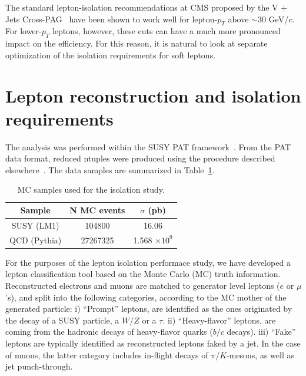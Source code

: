 \documentclass{cmspaper}
\begin{document}
The standard lepton-isolation recommendations at CMS proposed by the V + Jets Cross-PAG~\cite{vjets}
have been shown to work well for lepton-$p_T$ above $\sim 30$ GeV/$c$. For lower-$p_T$ leptons,
however, these cuts can have a much more pronounced impact on the efficiency. For this reason, it is
natural to look at separate optimization of the isolation requirements for soft leptons.

\section{Lepton reconstruction and isolation requirements}
\label{sec:lepRecoIsoReq}
The analysis was performed within the SUSY PAT framework~\cite{susypat}. From the PAT data format,
reduced ntuples were produced using the procedure described elsewhere~\cite{ICNT}. The data samples are
summarized in Table~\ref{tab:samples}.

\begin{table}[htbp]
   \centering
\begin{tabular}{|c|c|c|}
\hline
Sample & N MC events & $\sigma$ (pb) \\
\hline
SUSY (LM1) & 104800 & 16.06 \\
\hline
QCD (Pythia) & 27267325 & 1.568 $\times 10^9$ \\
\hline
\end{tabular}
   \caption{\small{MC samples used for the isolation study.}\label{tab:samples}}
\end{table}


For the purposes of the lepton isolation performace study, we have developed a lepton classification tool based on the Monte Carlo (MC) truth information. Reconstructed electrons and muons are matched to generator level leptons ($e$ or $\mu$'s), and split into the following categories, according to the MC mother of the generated particle: i) ``Prompt'' leptons, are identified as the ones originated by the decay of a SUSY particle, a $W/Z$ or a $\tau$. ii) ``Heavy-flavor'' leptons, are coming from the hadronic decays of heavy-flavor quarks ($b/c$ decays). iii) ``Fake'' leptons are typically identified as reconstructed leptons faked by a jet. In the case of muons, the latter category includes in-flight decays of $\pi/K$-mesons, as well as jet punch-through.


\end{document}
